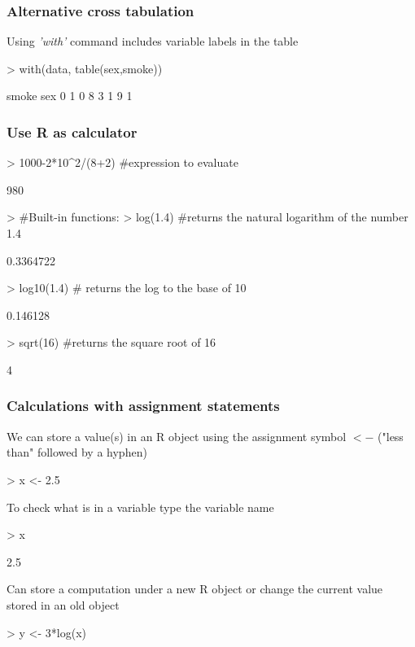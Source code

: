 \documentclass{beamer}
\begin{document}
\begin{frame}[fragile]\frametitle{Alternative cross tabulation}
Using \emph{'with'} command includes variable labels in the table
\begin{Schunk}
\begin{Sinput}
> with(data, table(sex,smoke)) 
\end{Sinput}
\begin{Soutput}
   smoke
sex 0 1
  0 8 3
  1 9 1
\end{Soutput}
\end{Schunk}
\end{frame}

\begin{frame}[fragile]\frametitle{Use R as calculator}
\begin{Schunk}
\begin{Sinput}
> 1000-2*10^2/(8+2)  #expression to evaluate
\end{Sinput}
\begin{Soutput}
[1] 980
\end{Soutput}
\begin{Sinput}
> #Built-in functions:
> log(1.4)  #returns the natural logarithm of the number 1.4
\end{Sinput}
\begin{Soutput}
[1] 0.3364722
\end{Soutput}
\begin{Sinput}
> log10(1.4)  # returns the log to the base of 10
\end{Sinput}
\begin{Soutput}
[1] 0.146128
\end{Soutput}
\begin{Sinput}
> sqrt(16)  #returns the square root of 16
\end{Sinput}
\begin{Soutput}
[1] 4
\end{Soutput}
\end{Schunk}
\end{frame}

\begin{frame}[fragile]\frametitle{Calculations with assignment statements}
We can store a value(s) in an R object using the assignment symbol $<-$ ("less than" followed by a hyphen)
\begin{Schunk}
\begin{Sinput}
> x <- 2.5
\end{Sinput}
\end{Schunk}
To check what is in a variable type the variable name
\begin{Schunk}
\begin{Sinput}
> x
\end{Sinput}
\begin{Soutput}
[1] 2.5
\end{Soutput}
\end{Schunk}
Can store a computation under a new R object or change the current value stored in an old object
\begin{Schunk}
\begin{Sinput}
> y <- 3*log(x)
\end{Sinput}
\end{Schunk}
\end{frame}
\end{document}
